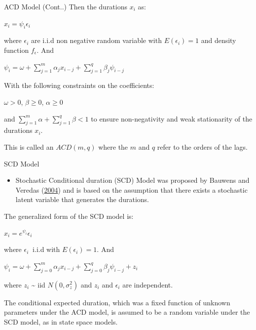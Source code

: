 \documentclass[
  ignorenonframetext,
]{beamer}
\providecommand{\tightlist}{%
  \setlength{\itemsep}{0pt}\setlength{\parskip}{0pt}}
\begin{document}
\begin{frame}{ACD Model (Cont..)}
\protect\hypertarget{acd-model-cont..}{}
Then the durations \(x_i\) as:

\(x_i = \psi_i \epsilon_i\)

where \(\epsilon_i\) are i.i.d non negative random variable with
\(E(\epsilon_i)=1\) and density function \(f_{\epsilon}\). And

\(\psi_i = \omega + \sum_{j=1}^m \alpha_j x_{i-j} + \sum_{j=1}^q \beta_j \psi_{i-j}\)

With the following constraints on the coefficients:

\(\omega > 0\), \(\beta \geq 0\), \(\alpha \geq 0\)

and \(\sum_{j=1}^m\alpha + \sum_{j=1}^q\beta < 1\) to ensure
non-negativity and weak stationarity of the durations \(x_i\).

This is called an \(ACD(m, q)\) where the \(m\) and \(q\) refer to the
orders of the lags.
\end{frame}

\begin{frame}{SCD Model}
\protect\hypertarget{scd-model}{}
\begin{itemize}
\tightlist
\item
  Stochastic Conditional duration (SCD) Model was proposed by Bauwens
  and Veredas (\protect\hyperlink{ref-SCD}{2004}) and is based on the
  assumption that there exists a stochastic latent variable that
  generates the durations.
\end{itemize}

The generalized form of the SCD model is:

\(x_i = e^{\psi_i} \epsilon_i\)

where \(\epsilon_i ~\) i.i.d with \(E(\epsilon_i)=1\). And

\(\psi_i = \omega + \sum_{j=0}^m \alpha_j x_{i-j} + \sum_{j=0}^q \beta_j \psi_{i-j} + z_i\)

where \(z_i\) \textasciitilde{} iid \(N(0,\sigma_z^2)\) and \(z_i\) and
\(\epsilon_i\) are independent.

The conditional expected duration, which was a fixed function of unknown
parameters under the ACD model, is assumed to be a random variable under
the SCD model, as in state space models.
\end{frame}
\end{document}

